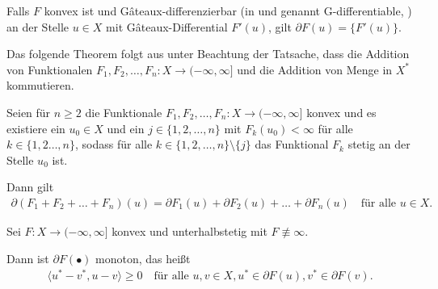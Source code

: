 \begin{theorem}
  \label{thm:subdiffGateaux}
  Falls $F$ konvex ist und G\^{a}teaux-differenzierbar
  (in \cite{Zei86} und \cite{Zei85} genannt \glqq G-differentiable\grqq, \cite[S.
  135f.]{Zei86})
  an der Stelle $u\in X$ mit G\^{a}teaux-Differential $F'(u)$,
  gilt $\partial F(u)=\{F'(u)\}$.
\end{theorem}

Das folgende Theorem folgt aus \cite[S. 389, Theorem 47.B]{Zei85} unter 
Beachtung der Tatsache, dass die Addition von Funktionalen 
$F_1,F_2,\ldots,F_n:X\to (-\infty,\infty]$ und die Addition von
Menge in $X^\ast$ kommutieren.

\begin{theorem}
  \label{thm:subdifferentialSumRule}
  Seien für $n\geq 2$ die Funktionale $F_1,F_2,\ldots,F_n: X\to
  (-\infty,\infty]$ konvex und es existiere
  ein $u_0\in X$ und ein $j\in\{1,2,\ldots,n\}$ mit $F_k(u_0)<\infty$
  für alle $k\in\{1,2\ldots,n\}$, 
  sodass für alle $k\in\{1,2,\ldots,n\}\setminus\{j\}$ das Funktional
  $F_k$ stetig an der Stelle $u_0$ ist.

  Dann gilt 
  \begin{align*}
    \partial (F_1+F_2+\ldots+ F_n)(u) 
    = \partial F_1(u)+\partial F_2(u)+ \ldots + \partial F_n(u) \quad\text{für
    alle } u\in X.
  \end{align*}
\end{theorem}

\begin{theorem}
  \label{thm:subdifferentialMonotonicity}
  Sei $F:X\to (-\infty,\infty]$ konvex und unterhalbstetig mit $F\nequiv\infty$.

  Dann ist $\partial F(\bullet)$ monoton, das heißt 
  \begin{align*}
    \langle u^\ast-v^\ast,u-v\rangle\geq 0\quad \text{für alle } u,v\in X, 
    u^\ast \in \partial F(u), v^\ast \in \partial F(v).
  \end{align*}
\end{theorem}


